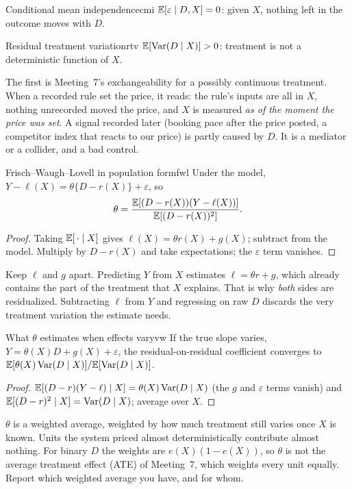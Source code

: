\documentclass[11pt]{article}
\begin{document}
\begin{assum}{Conditional mean independence}{cmi}
$\mathbb{E}[\varepsilon \mid D, X] = 0$: given $X$, nothing left in the outcome moves with $D$.
\end{assum}
\begin{assum}{Residual treatment variation}{rtv}
$\mathbb{E}[\operatorname{Var}(D \mid X)] > 0$: treatment is not a deterministic function of $X$.
\end{assum}

The first is Meeting~7's exchangeability for a possibly continuous treatment. When a recorded rule set the price, it reads: the
rule's inputs are all in $X$, nothing unrecorded moved the price, and $X$ is measured \emph{as of the moment the price was set}. A
signal recorded later (booking pace after the price posted, a competitor index that reacts to our price) is partly caused by $D$.
It is a mediator or a collider, and a bad control.

\begin{prop}{Frisch--Waugh--Lovell in population form}{fwl}
Under the model, $Y - \ell(X) = \theta\{D - r(X)\} + \varepsilon$, so
\[
  \theta = \frac{\mathbb{E}[(D - r(X))(Y - \ell(X))]}{\mathbb{E}[(D - r(X))^2]} .
\]
\end{prop}
\begin{proof}
Taking $\mathbb{E}[\,\cdot \mid X]$ gives $\ell(X) = \theta r(X) + g(X)$; subtract from the model. Multiply by $D - r(X)$ and take expectations;
the $\varepsilon$ term vanishes.
\end{proof}

Keep $\ell$ and $g$ apart. Predicting $Y$ from $X$ estimates $\ell = \theta r + g$, which already contains the part of the treatment
that $X$ explains. That is why \emph{both} sides are residualized. Subtracting $\ell$ from $Y$ and regressing on raw $D$ discards the very
treatment variation the estimate needs.

\begin{prop}{What $\theta$ estimates when effects vary}{vw}
If the true slope varies, $Y = \theta(X)D + g(X) + \varepsilon$, the residual-on-residual coefficient converges to
$\mathbb{E}[\theta(X)\operatorname{Var}(D \mid X)]/\mathbb{E}[\operatorname{Var}(D \mid X)]$.
\end{prop}
\begin{proof}
$\mathbb{E}[(D - r)(Y - \ell) \mid X] = \theta(X)\operatorname{Var}(D \mid X)$ (the $g$ and $\varepsilon$ terms vanish) and $\mathbb{E}[(D-r)^2 \mid X] = \operatorname{Var}(D \mid X)$;
average over $X$.
\end{proof}

$\theta$ is a weighted average, weighted by how much treatment still varies once $X$ is known. Units the system priced almost
deterministically contribute almost nothing. For binary $D$ the weights are $e(X)(1-e(X))$, so $\theta$ is not the average treatment effect (ATE) of Meeting~7, which weights
every unit equally. Report which weighted average you have, and for whom.
\end{document}
